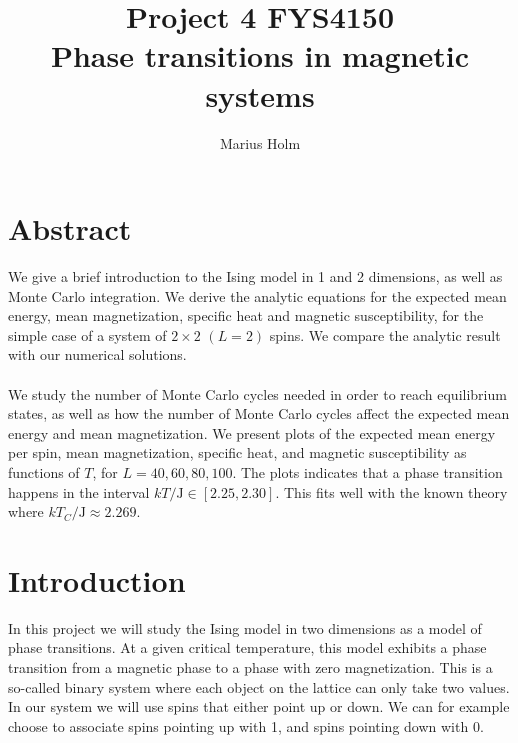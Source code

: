 \documentclass[a4paper, fontsize=11pt]{article}
\begin{document}
\title{Project 4 FYS4150 \\ Phase transitions in magnetic systems}
\author{Marius Holm}

\maketitle


\section{Abstract}
We give a brief introduction to the Ising model in 1 and 2 dimensions, as well as Monte Carlo integration. We derive the analytic equations for the expected mean energy, mean magnetization, specific heat and magnetic susceptibility, for the simple case of a system of $2 \times 2$ $(L=2)$ spins. We compare the analytic result with our numerical solutions. 

\paragraph{}
We study the number of Monte Carlo cycles needed in order to reach equilibrium states, as well as how the number of Monte Carlo cycles affect the expected mean energy and mean magnetization. We present plots of the expected mean energy per spin, mean magnetization, specific heat, and magnetic susceptibility as functions of $T$, for $L = 40, 60, 80, 100$. The plots indicates that a phase transition happens in the interval $kT/\text{J} \in [2.25, 2.30]$. This fits well with the known theory where $kT_{C}/\text{J} \approx 2.269$.  

\section{Introduction}
In this project we will study the Ising model in two dimensions as a model of phase transitions. At a given critical temperature, this model exhibits a phase transition from a magnetic phase to a phase with zero magnetization. This is a so-called binary system where each object on the lattice can only take two values. In our system we will use spins that either point up or down. We can for example choose to associate spins pointing up with 1, and spins pointing down with 0. 
\end{document}
